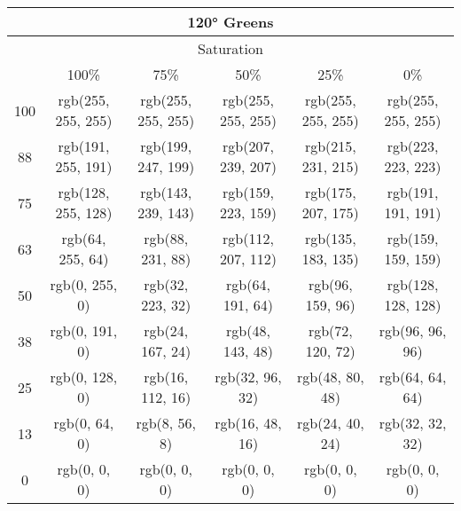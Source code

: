 \documentclass[a4j]{jarticle}
\begin{document}
\begin{tabular}{|c|c|c|c|c|c|}
\multicolumn{6}{|c|}{120°
 Greens}\\\hline\multicolumn{6}{|c|}{Saturation}\\\hline&100\%&75\%&50\%&25\%&0\%\\\hline100&rgb(255,
     255, 255)&rgb(255, 255, 255)&rgb(255, 255, 255)&rgb(255, 255,
                 255)&rgb(255, 255, 255)\\\hline88&rgb(191, 255,
     191)&rgb(199, 247, 199)&rgb(207, 239, 207)&rgb(215, 231,
                 215)&rgb(223, 223, 223)\\\hline75&rgb(128, 255,
     128)&rgb(143, 239, 143)&rgb(159, 223, 159)&rgb(175, 207,
                 175)&rgb(191, 191, 191)\\\hline63&rgb(64, 255,
     64)&rgb(88, 231, 88)&rgb(112, 207, 112)&rgb(135, 183, 135)&rgb(159,
                     159, 159)\\\hline50&rgb(0, 255, 0)&rgb(32, 223,
         32)&rgb(64, 191, 64)&rgb(96, 159, 96)&rgb(128, 128,
                     128)\\\hline38&rgb(0, 191, 0)&rgb(24, 167,
         24)&rgb(48, 143, 48)&rgb(72, 120, 72)&rgb(96, 96,
                     96)\\\hline25&rgb(0, 128, 0)&rgb(16, 112,
         16)&rgb(32, 96, 32)&rgb(48, 80, 48)&rgb(64, 64,
                     64)\\\hline13&rgb(0, 64, 0)&rgb(8, 56, 8)&rgb(16,
             48, 16)&rgb(24, 40, 24)&rgb(32, 32, 32)\\\hline0&rgb(0, 0,
     0)&rgb(0, 0, 0)&rgb(0, 0, 0)&rgb(0, 0, 0)&rgb(0, 0, 0) 
\end{tabular}
\end{document}
